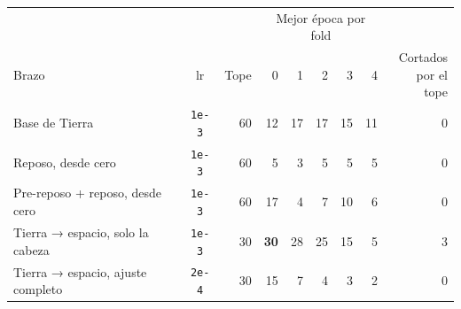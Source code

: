\begin{tabular}{lcrrrrrrr}\toprule
 & & & \multicolumn{5}{c}{Mejor época por fold} & \\
\cmidrule(lr){4-8}
 Brazo & lr & Tope & 0 & 1 & 2 & 3 & 4 & \makecell{Cortados\\por el tope} \\
\midrule
Base de Tierra & \texttt{1e-3} & 60 & 12 & 17 & 17 & 15 & 11 & 0 \\
Reposo, desde cero & \texttt{1e-3} & 60 & 5 & 3 & 5 & 5 & 5 & 0 \\
Pre-reposo + reposo, desde cero & \texttt{1e-3} & 60 & 17 & 4 & 7 & 10 & 6 & 0 \\
Tierra → espacio, solo la cabeza & \texttt{1e-3} & 30 & \textbf{30} & 28 & 25 & 15 & 5 & 3 \\
Tierra → espacio, ajuste completo & \texttt{2e-4} & 30 & 15 & 7 & 4 & 3 & 2 & 0 \\
\bottomrule\end{tabular}
